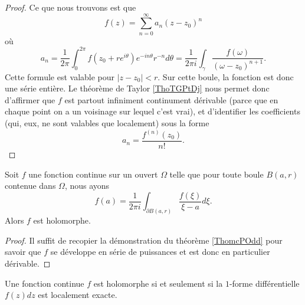 \begin{proof}
    Ce que nous trouvons est que
    \begin{equation}
        f(z)=\sum_{n=0}^{\infty}a_n(z-z_0)^n
    \end{equation}
    où
    \begin{equation}
        a_n=\frac{1}{ 2\pi }\int_0^{2\pi}f(z_0+r e^{i\theta}) e^{-in\theta}r^{-n}d\theta=\frac{1}{ 2\pi i }\int_{\gamma}\frac{ f(\omega) }{ (\omega-z_0)^{n+1} }.
    \end{equation}
    Cette formule est valable pour \( | z-z_0 |<r\). Sur cette boule, la fonction est donc une série entière. Le théorème de Taylor \ref{ThoTGPtDj} nous permet donc d'affirmer que \( f\) est partout infiniment continument dérivable (parce que en chaque point on a un voisinage sur lequel c'est vrai), et d'identifier les coefficients (qui, eux, ne sont valables que localement) sous la forme
    \begin{equation}
        a_n=\frac{ f^{(n)}(z_0) }{ n! }.
    \end{equation}
\end{proof}

\begin{corollary}       \label{CorwfHtJu}
    Soit \( f\) une fonction continue sur un ouvert \( \Omega\) telle que pour toute boule \( B(a,r)\) contenue dans \( \Omega\), nous ayons
    \begin{equation}
        f(a)=\frac{1}{ 2\pi i }\int_{\partial B(a,r)}\frac{ f(\xi) }{ \xi-a }d\xi.
    \end{equation}
    Alors \( f\) est holomorphe.
\end{corollary}

\begin{proof}
    Il suffit de recopier la démonstration du théorème \ref{ThomcPOdd} pour savoir que \( f\) se développe en série de puissances et est donc en particulier dérivable.
\end{proof}

\begin{proposition}\label{PropZOkfmO}
    Une fonction continue \( f\) est holomorphe si et seulement si la \( 1\)-forme différentielle \( f(z)dz\) est localement exacte.
\end{proposition}

